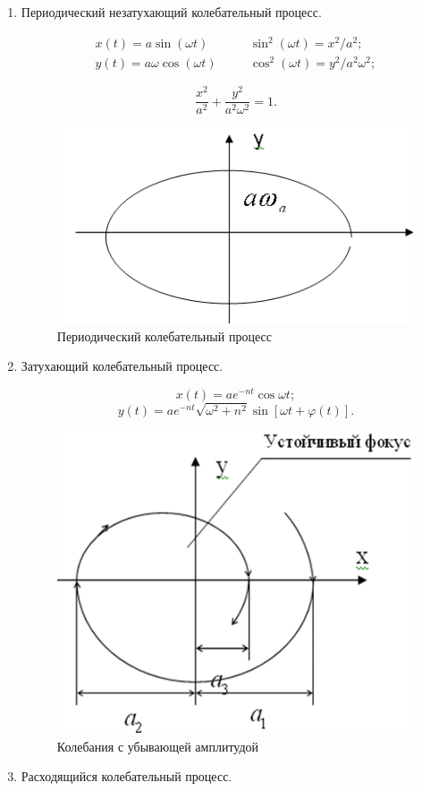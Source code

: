 \documentclass[unicode, 12pt, a4paper, oneside]{article}
\begin{document}
\begin{enumerate}
\item Периодический незатухающий колебательный процесс.

\begin{eqnarray}
x(t) = a \sin(\omega t)			&\quad& \sin^2(\omega t) = x^2 / a^2 ;\\
y(t) = a\omega \cos (\omega t)	&\quad& \cos^2(\omega t) = y^2 / a^2 \omega^2;
\end{eqnarray}

\begin{equation}
\dfrac{x^2}{a^2} + \dfrac{y^2}{a^2 \omega^2} = 1.
\end{equation}

\begin{figure}[H]
\centering
\includegraphics[width=0.4\linewidth]{30_per_nez.png}
\caption{Периодический колебательный процесс}
\end{figure}


\item Затухающий колебательный процесс.

\begin{equation}
x(t) = ae^{-nt} \cos \omega t;
\end{equation}
\begin{equation}
y(t) = ae^{-nt} \sqrt{\omega^2 + n^2} \sin[\omega t + \varphi(t) ].
\end{equation}

\begin{figure}[H]
\centering
\includegraphics[width=0.4\linewidth]{30_coleb_zat.png}
\caption{Колебания с убывающей амплитудой}
\end{figure}


\item Расходящийся колебательный процесс.


\end{enumerate}
\end{document}

